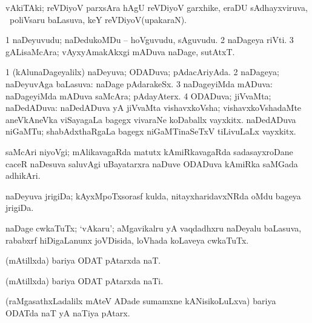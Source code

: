 {\bentry
{} 
\gl{\nA}
\expl{}
\bmng
vAkiTAki; reVDiyoV parxsAra hAgU reVDiyoV garxhike, eraDU sAdhayxviruva, \sA\ poliVsaru baLasuva, keY reVDiyoV(upakaraN). 
\emng
\eentry

\bentry
{} 
\gl{\nA}
\expl{}
\bmng
\bnum
\num{1} naDeyuvudu; naDedukoMDu -- hoVguvudu, sAguvudu. 
\num{2} naDageya riVti. 
\num{3} gALisaMcAra; vAyxyAmakAkxgi mADuva naDage, sutAtxT. 
\enum
\emng
\eentry

\bentry
{} 
\gl{\gu}
\expl{}
\bmng
\bnum
\num{1} (kAlunaDageyalilx) naDeyuva; ODADuva; pAdacAriyAda. 
\num{2} naDageya; naDeyuvAga baLasuva:  naDage pAdarakeSx. 
\num{3} naDageyiMda mADuva:  naDageyiMda mADuva saMcAra; pAdayAterx. 
\num{4} ODADuva; jiVvaMta; naDedADuva:  naDedADuva yA jiVvaMta vishavxkoVsha; vishavxkoVshadaMte aneVkAneVka viSayagaLa bagegx vivaraNe koDaballx vayxkitx.  naDedADuva niGaMTu; shabAdxthaRgaLa bagegx niGaMTinaSeTxV tiLivuLaLx vayxkitx. 
\enum
\emng
\eentry

\bentry
{} 
\gl{\nA}
\expl{}
\bmng
saMcAri niyoVgi; mAlikavagaRda matutx kAmiRkavagaRda sadasayxroDane caceR naDesuva saluvAgi uBayatarxra naDuve ODADuva kAmiRka saMGada adhikAri. 
\emng
\eentry

\bentry
{} 
\gl{\nA}
\expl{}
\bmng
naDeyuva jrigiDa; kAyxMpoTxsorasf kulda, nitayxharidavxNRda oMdu bageya jrigiDa. 
\emng
\eentry

\bentry
{} 
\gl{\nA}
\expl{}
\bmng
naDage cwkaTuTx; `vAkaru'; aMgavikalru yA vaqdadhxru naDeyalu baLasuva, rababxrf hiDigaLanunx joVDisida, loVhada koLaveya cwkaTuTx. 
\emng
\eentry

\bentry
{} 
\gl{\nA}
\expl{}
\bmng
(mAtillxda) bariya ODAT pAtarxda naT. 
\emng
\eentry

\bentry
{} 
\gl{\nA}
\expl{}
\bmng
(mAtillxda) bariya ODAT pAtarxda naTi. 
\emng
\eentry

\bentry
{} 
\gl{\nA}
\expl{}
\bmng
{} 
\emng
\eentry

\bentry
{} 
\gl{\nA}
\expl{}
\bmng
(raMgasathxLadalilx mAteV ADade sumamxne kANisikoLuLxva) bariya ODATda naT yA naTiya pAtarx. 
\emng
\eentry

}
